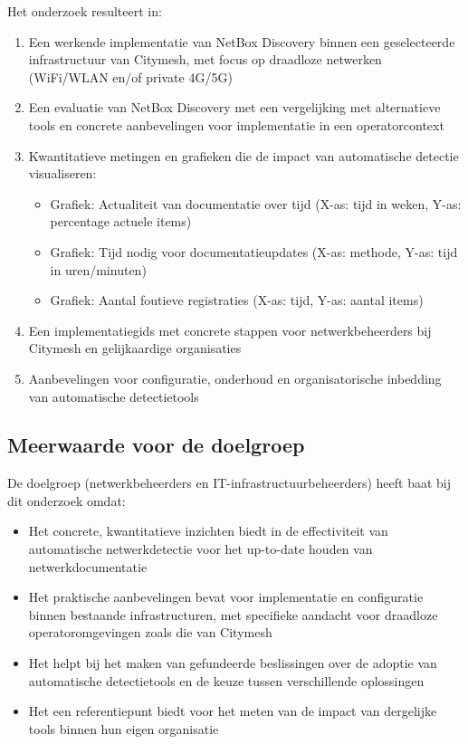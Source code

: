 Het onderzoek resulteert in:
\begin{enumerate}
  \item Een werkende implementatie van NetBox Discovery binnen een geselecteerde infrastructuur van Citymesh, met focus op draadloze netwerken (WiFi/WLAN en/of private 4G/5G)
  \item Een evaluatie van NetBox Discovery met een vergelijking met alternatieve tools en concrete aanbevelingen voor implementatie in een operatorcontext
  \item Kwantitatieve metingen en grafieken die de impact van automatische detectie visualiseren:
  \begin{itemize}
    \item Grafiek: Actualiteit van documentatie over tijd (X-as: tijd in weken, Y-as: percentage actuele items)
    \item Grafiek: Tijd nodig voor documentatieupdates (X-as: methode, Y-as: tijd in uren/minuten)
    \item Grafiek: Aantal foutieve registraties (X-as: tijd, Y-as: aantal items)
  \end{itemize}
  \item Een implementatiegids met concrete stappen voor netwerkbeheerders bij Citymesh en gelijkaardige organisaties
  \item Aanbevelingen voor configuratie, onderhoud en organisatorische inbedding van automatische detectietools
\end{enumerate}

\subsection{Meerwaarde voor de doelgroep}

De doelgroep (netwerkbeheerders en IT-infrastructuurbeheerders) heeft baat bij dit onderzoek omdat:
\begin{itemize}
  \item Het concrete, kwantitatieve inzichten biedt in de effectiviteit van automatische netwerkdetectie voor het up-to-date houden van netwerkdocumentatie
  \item Het praktische aanbevelingen bevat voor implementatie en configuratie binnen bestaande infrastructuren, met specifieke aandacht voor draadloze operatoromgevingen zoals die van Citymesh
  \item Het helpt bij het maken van gefundeerde beslissingen over de adoptie van automatische detectietools en de keuze tussen verschillende oplossingen
  \item Het een referentiepunt biedt voor het meten van de impact van dergelijke tools binnen hun eigen organisatie
\end{itemize}

